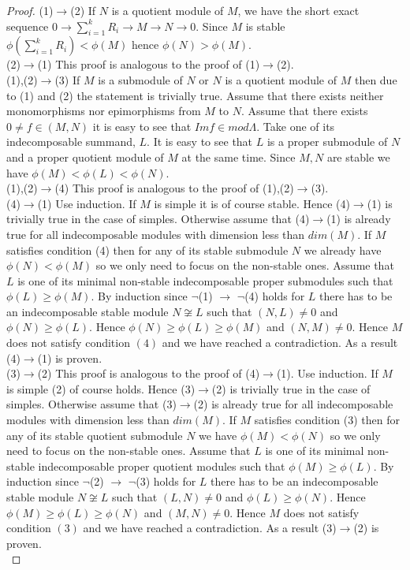 \begin{proof}
\indent (1)$\to$(2) If $N$ is a quotient module of $M$, we have the short exact sequence $0\to\sum_{i=1}^kR_i\to M\to N\to 0$. Since $M$ is stable $\phi(\sum_{i=1}^kR_i)<\phi(M)$ hence $\phi(N)>\phi(M)$.\\
\indent (2)$\to$(1) This proof is analogous to the proof of (1)$\to$(2).\\
\indent (1),(2)$\to$(3) If $M$ is a submodule of $N$ or $N$ is a quotient module of $M$ then due to (1) and (2) the statement is trivially true. Assume that there exists neither monomorphisms nor epimorphisms from $M$ to $N$. Assume that there exists $0\neq f\in(M,N)$ it is easy to see that $Im f\in mod\Lambda$. Take one of its indecomposable summand, $L$. It is easy to see that $L$ is a proper submodule of $N$ and a proper quotient module of $M$ at the same time. Since $M,N$ are stable we have $\phi(M)<\phi(L)<\phi(N)$.\\
\indent (1),(2)$\to$(4) This proof is analogous to the proof of (1),(2)$\to$(3).\\
\indent (4)$\to$(1) Use induction. If $M$ is simple it is of course stable. Hence (4)$\to$(1) is trivially true in the case of simples. Otherwise assume that (4)$\to$(1) is already true for all indecomposable modules with dimension less than $dim(M)$. If $M$ satisfies condition (4) then for any of its stable submodule $N$ we already have $\phi(N)<\phi(M)$ so we only need to focus on the non-stable ones. Assume that $L$ is one of its minimal non-stable indecomposable proper submodules such that $\phi(L)\geq\phi(M)$. By induction since $\lnot$(1) $\to$ $\lnot$(4) holds for $L$ there has to be an indecomposable stable module $N\not\cong L$ such that $(N,L)\neq 0$ and $\phi(N)\geq \phi(L)$. Hence $\phi(N)\geq\phi(L)\geq\phi(M)$ and $(N,M)\neq 0$. Hence $M$ does not satisfy condition $(4)$ and we have reached a contradiction. As a result (4)$\to$(1) is proven.\\
\indent (3)$\to$(2) This proof is analogous to the proof of (4)$\to$(1). Use induction. If $M$ is simple (2) of course holds. Hence (3)$\to$(2) is trivially true in the case of simples. Otherwise assume that (3)$\to$(2) is already true for all indecomposable modules with dimension less than $dim(M)$. If $M$ satisfies condition (3) then for any of its stable quotient submodule $N$ we have $\phi(M)<\phi(N)$ so we only need to focus on the non-stable ones. Assume that $L$ is one of its minimal non-stable indecomposable proper quotient modules such that $\phi(M)\geq\phi(L)$. By induction since $\lnot$(2) $\to$ $\lnot$(3) holds for $L$ there has to be an indecomposable stable module $N\not\cong L$ such that $(L,N)\neq 0$ and $\phi(L)\geq \phi(N)$. Hence $\phi(M)\geq\phi(L)\geq\phi(N)$ and $(M,N)\neq 0$. Hence $M$ does not satisfy condition $(3)$ and we have reached a contradiction. As a result (3)$\to$(2) is proven.\\
\end{proof}
